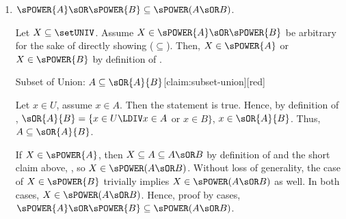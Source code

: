 \begin{enumerate}
\begin{enumerate}
    \item $\sPOWER{A} \sOR \sPOWER{B} \subseteq \sPOWER(A \sOR B)$.
    \begin{subprove}
      Let $X \subseteq\setUNIV$. Assume $X\in\sPOWER{A} \sOR \sPOWER{B}$ be arbitrary for the sake of directly showing ($\subseteq$). 
      Then, $X \in \sPOWER{A}$ or $X \in \sPOWER{B}$ by definition of . 
      \begin{define}{Subset of Union: $A \subseteq \sOR{A}{B}$}[claim:subset-union][red]
        \begin{subprove}[red]
            Let $x\in U$, assume $x\in A$. Then the statement  is true.
            Hence, by definition of , $\sOR{A}{B}=\{x\in U\LDIV x\in A$ or $x\in B\}$, $x\in \sOR{A}{B}$.
            Thus, $A \subseteq \sOR{A}{B}$.
        \end{subprove}
      \end{define}
      If $X \in \sPOWER{A}$, then $X \subseteq A \subseteq A \sOR B$ by definition of  and the short claim above, , 
      so $X \in \sPOWER(A \sOR B)$.
      Without loss of generality, the case of $X \in \sPOWER{B}$ trivially implies $X \in \sPOWER(A \sOR B)$ as well. 
      In both cases, $X \in \sPOWER(A \sOR B)$. 
      Hence, proof by cases, $\sPOWER{A} \sOR \sPOWER{B} \subseteq \sPOWER(A \sOR B)$.
    \end{subprove}
  \end{enumerate}
\end{enumerate}